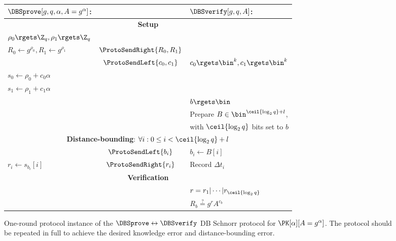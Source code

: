 \begin{figure*}
  \centering
  \begin{tabular}{lcl}
    \(\DBSprove[g, q, \alpha, A = g^\alpha]\):
    & &
    \(\DBSverify[g, q, A]\):
    \\
    \midrule

    \multicolumn{3}{c}{\textbf{Setup}} \\

    \(\rho_0\rgets \Z_q, \rho_1\rgets \Z_q\)
    &
    &
    \\

    \(R_0\gets g^{\rho_0}, R_1\gets g^{\rho_1}\)
    & \(\ProtoSendRight{R_0, R_1}\)
    &
    \\

    & \(\ProtoSendLeft{c_0, c_1}\)
    & \(c_0\rgets \bin^k, c_1\rgets \bin^k\)
    \\

    \(s_0\gets \rho_0 + c_0\alpha\)
    &
    &
    \\

    \(s_1\gets \rho_1 + c_1\alpha\)
    &
    &
    \\

    &
    & \(b\rgets \bin\)
    \\

    &
    & Prepare \(B\in \bin^{\ceil{\log_2 q}+l}\),
    \\

    &
    & with \(\ceil{\log_2 q}\) bits set to \(b\)
    \\

    \midrule
    \multicolumn{3}{c}{\textbf{Distance-bounding}: \(\forall i: 0\leq i < 
        \ceil{\log_2 q} + l\)} \\


    & \(\ProtoSendLeft{b_i}\)
    & \(b_i\gets B[i]\)
    \\

    \(r_i\gets s_{b_i}[i]\)
    & \(\ProtoSendRight{r_i}\)
    & Record \(\Delta t_i\)
    \\

    \midrule
    \multicolumn{3}{c}{\textbf{Verification}}
    \\

    &
    & \(r = r_1|\dotsb|r_{\ceil{\log_2 q}}\)
    \\

    &
    & \(R_b \stackrel{?}{=} g^r A^{c_b}\)
    \\
    
  \end{tabular}
  \caption{%
    One-round protocol instance of the \(\DBSprove\leftrightarrow \DBSverify\) 
    \ac{DB} Schnorr protocol for \(\PK[\alpha][A = g^\alpha]\).
    The protocol should be repeated in full to achieve the desired knowledge 
    error and distance-bounding error.
  }%
  \label{SchnorrFigure}
\end{figure*}

